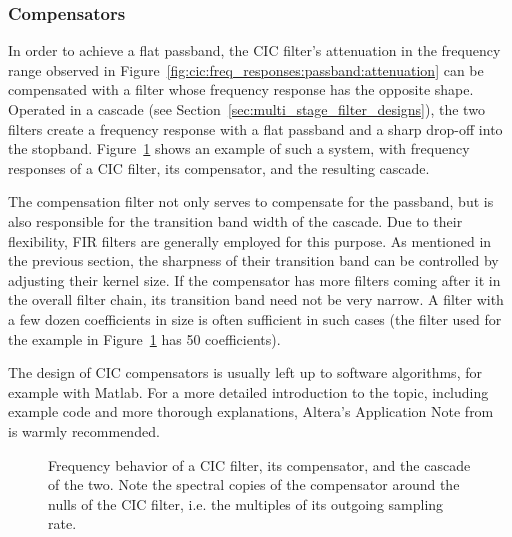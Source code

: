 \subsubsection{Compensators} %
\label{subsubsec:cic:compensators}

In     order      to     achieve     a     flat      passband,     the     CIC
filter's    attenuation     in    the    frequency    range     observed    in
Figure~\ref{fig:cic:freq_responses:passband:attenuation}  can  be  compensated
with a filter  whose frequency response has the opposite  shape. Operated in a
cascade  (see Section~\ref{sec:multi_stage_filter_designs}),  the two  filters
create a frequency response with a flat passband and a sharp drop-off into the
stopband. Figure~\ref{fig:cic:cfir} shows  an example  of such a  system, with
frequency  responses of  a  CIC  filter, its  compensator,  and the  resulting
cascade.

The compensation filter not only serves to compensate for the passband, but is
also responsible  for the transition band  width of the cascade. Due  to their
flexibility, FIR filters are generally employed for this purpose. As mentioned
in  the previous  section,  the  sharpness of  their  transition  band can  be
controlled  by  adjusting  their  kernel size. If  the  compensator  has  more
filters  coming after  it in  the overall  filter chain,  its transition  band
need  not be  very narrow. A  filter  with a  few dozen  coefficients in  size
is  often  sufficient in  such  cases  (the filter  used  for  the example  in
Figure~\ref{fig:cic:cfir} has \num{50} coefficients).

The design of CIC compensators is  usually left up to software algorithms, for
example with Matlab. For a more detailed introduction to the topic, including
example  code  and  more  thorough  explanations,  Altera's  Application  Note
from~\cite{altera:an455} is warmly recommended.

\begin{figure}
    \centering
    
    \caption[CIC Compensator]{%
        Frequency behavior of  a CIC filter, its compensator,  and the cascade
        of the  two. Note the  spectral copies of  the compensator  around the
        nulls of the  CIC filter, i.e. the multiples of  its outgoing sampling
        rate.%
    }
    \label{fig:cic:cfir}
\end{figure}
%
%
